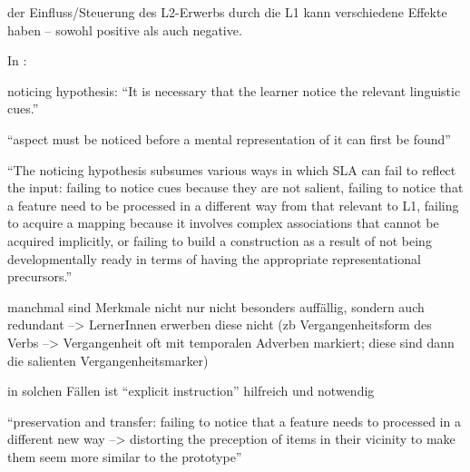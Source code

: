 


der Einfluss/Steuerung des L2-Erwerbs durch die L1 kann verschiedene Effekte haben -- sowohl positive als auch negative.



        In \cite{Ellis04}:

        noticing hypothesis: ``It is necessary that the learner notice the relevant linguistic cues.''

        ``aspect must be noticed before a mental representation of it can first be found''

        ``The noticing hypothesis subsumes various ways in which SLA can fail to reflect the input: failing to notice cues because they are not salient, failing to notice that a feature need to be processed in a different way from that relevant to L1, failing to acquire a mapping because it involves complex associations that cannot be acquired implicitly, or failing to build a construction as a result of not being developmentally ready in terms of having the appropriate representational precursors.''

        manchmal sind Merkmale nicht nur nicht besonders auffällig, sondern auch redundant --> LernerInnen erwerben diese nicht (zb Vergangenheitsform des Verbs --> Vergangenheit oft mit temporalen Adverben markiert; diese sind dann die salienten Vergangenheitsmarker)

        in solchen Fällen ist ``explicit instruction'' hilfreich und notwendig

        ``preservation and transfer: failing to notice that a feature needs to processed in a different new way --> distorting the preception of items in their vicinity to make them seem more similar to the prototype''

